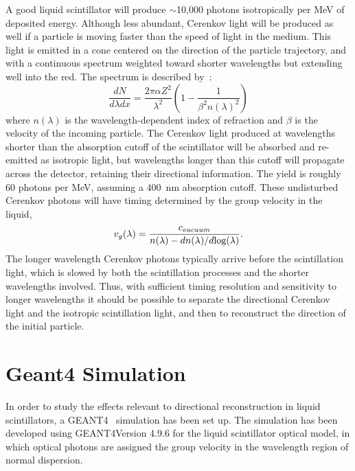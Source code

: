 \documentclass[aps,prc,twocolumn,groupedaddress,showpacs,amsmath,amssymb,floatfix,superscriptaddress]{revtex4}
\newcommand{\GEANT}{GEANT4}
\begin{document}
A good liquid scintillator will produce $\sim$10,000 photons
isotropically per MeV of deposited energy. Although less abundant,
Cerenkov light will be produced as well if a particle is moving faster
than the speed of light in the medium.  This light is emitted in a
cone centered on the direction of the particle trajectory, and with a
continuous spectrum weighted toward shorter wavelengths
but extending well into the red. The spectrum is described by~\cite{Cherenkov_spectrum}:
\begin{equation}
\label{eqCerenkov}
\frac{dN}{d\lambda dx} = \frac{2 \pi \alpha Z^2}{\lambda^2} ( 1 - \frac{1}{\beta^2 n(\lambda)^2} )
\end{equation}
where $n(\lambda)$ is the wavelength-dependent index of refraction and
$\beta$ is the velocity of the incoming particle. The Cerenkov light
produced at wavelengths shorter than the absorption cutoff of the
scintillator will be absorbed and re-emitted as isotropic light, but
wavelengths longer than this cutoff will propagate across the
detector, retaining their directional information. The yield is
roughly 60 photons per MeV, assuming a 400~nm absorption
cutoff\cite{qdot}. These undisturbed Cerenkov photons will have timing
determined by the group velocity \cite{group_velocity_article} in the liquid,
\begin{equation}
\label{eqGroup}
v_{g}(\lambda) = \frac{c_{vacuum}}{n(\lambda) - dn(\lambda)/d\textnormal{log}(\lambda)}.
\end{equation}
The longer wavelength Cerenkov photons typically arrive before
the scintillation light, which is slowed by both the scintillation
processes and the shorter wavelengths involved. Thus, with sufficient
timing resolution and sensitivity to longer wavelengths it should be
possible to separate the directional Cerenkov light and the isotropic
scintillation light, and then to reconstruct the direction of the
initial particle.

\section{Geant4 Simulation}
In order to study the effects relevant to directional
reconstruction in liquid scintillators, a 
\GEANT~\cite{geant4one,geant4two} simulation has been set up. The 
simulation has been developed using \GEANT Version 4.9.6 for the
liquid scintillator optical model, in which optical photons are
assigned the group velocity in the wavelength region of normal
dispersion.
\end{document}
